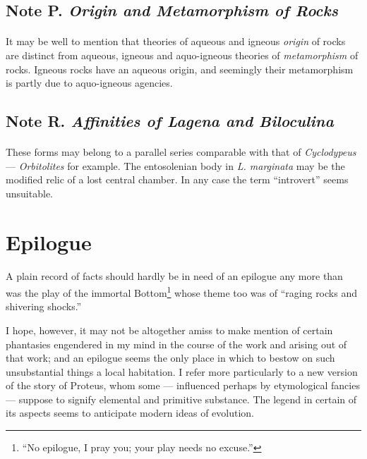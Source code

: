 \documentclass[a4paper, 12pt, oneside]{article}
\begin{document}
\subsection{Note P. \emph{Origin and Metamorphism of Rocks}}
\paragraph{}
It may be well to mention that theories of aqueous and igneous \emph{origin} of rocks are distinct from aqueous, igneous and aquo-igneous theories of \emph{metamorphism} of rocks. Igneous rocks have an aqueous origin, and seemingly their metamorphism is partly due to aquo-igneous agencies.

\subsection{Note R. \emph{Affinities of Lagena and Biloculina}}
\paragraph{}
These forms may belong to a parallel series comparable with that of \emph{Cyclodypeus} --- \emph{Orbitolites} for example. The entosolenian body in \emph{L. marginata} may be the modified relic of a lost central chamber. In any case the term ``introvert'' seems unsuitable.
\clearpage
\section{Epilogue}
\paragraph{}
A plain record of facts should hardly be in need of an epilogue any more than was the play of the immortal Bottom\footnote{``No epilogue, I pray you; your play needs no excuse.''} whose theme too was of ``raging rocks and shivering shocks.''

I hope, however, it may not be altogether amiss to make mention of certain phantasies engendered in my mind in the course of the work and arising out of that work; and an epilogue seems the only place in which to bestow on such unsubstantial things a local habitation. I refer more particularly to a new version of the story of Proteus, whom some --- influenced perhaps by etymological fancies --- suppose to signify elemental and primitive substance. The legend in certain of its aspects seems to anticipate modern ideas of evolution.
\end{document}
